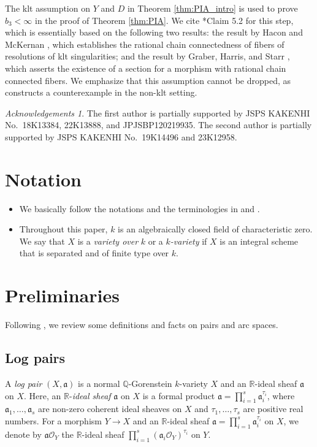 \documentclass[a4paper,11pt]{amsart}
\theoremstyle{definition}
\theoremstyle{remark}
\newtheorem*{ackn}{Acknowledgements}
\begin{document}
The klt assumption on $Y$ and $D$ in Theorem \ref{thm:PIA_intro} is used to prove $b_3 < \infty$ in the proof of Theorem \ref{thm:PIA}. 
We cite \cite{NS22}*{Claim 5.2} for this step, which is essentially based on the following two results: the result by Hacon and McKernan \cite{HM07}, which establishes the rational chain connectedness of fibers of resolutions of klt singularities; and the result by Graber, Harris, and Starr \cite{GHS03}, which asserts the existence of a section for a morphism with rational chain connected fibers. 
We emphasize that this assumption cannot be dropped, as \cite{NS4} constructs a counterexample in the non-klt setting. 

\begin{ackn} 
The first author is partially supported by JSPS KAKENHI No.\
18K13384, 22K13888, and JPJSBP120219935. The second author is
partially supported by JSPS KAKENHI No.\ 19K14496 and 23K12958.
\end{ackn}


\section*{Notation}

\begin{itemize}
\item 
We basically follow the notations and the terminologies in \cite{Har77} and \cite{Kol13}. 


\item 
Throughout this paper, $k$ is an algebraically closed field  of characteristic zero. 
We say that $X$ is a \textit{variety over} $k$ or a \textit{$k$-variety} if 
$X$ is an integral scheme that is separated and of finite type over $k$. 
\end{itemize}


\section{Preliminaries}\label{section:pre}
Following \cite{NS22}, we review some definitions and facts on pairs and arc spaces.
\subsection{Log pairs}
A \textit{log pair} $(X, \mathfrak{a})$ is a normal $\mathbb{Q}$-Gorenstein $k$-variety $X$ and 
an $\mathbb{R}$-ideal sheaf $\mathfrak{a}$ on $X$. 
Here, an $\mathbb{R}$-\textit{ideal sheaf} $\mathfrak{a}$ on $X$ is a formal product 
$\mathfrak{a} = \prod _{i = 1} ^s \mathfrak{a}_i ^{\tau_i}$, where $\mathfrak{a}_1, \ldots, \mathfrak{a}_s$ are 
non-zero coherent ideal sheaves on $X$ 
and $\tau _1, \ldots , \tau _s$ are positive real numbers. 
For a morphism $Y \to X$ and an $\mathbb{R}$-ideal sheaf $\mathfrak{a} = \prod _{i = 1} ^s \mathfrak{a}_i ^{\tau _i}$ on $X$, 
we denote by $\mathfrak{a} \mathcal{O}_Y$ the $\mathbb{R}$-ideal sheaf $\prod _{i = 1} ^s (\mathfrak{a}_i \mathcal{O}_Y)  ^{\tau _i}$ on $Y$. 
\end{document}

